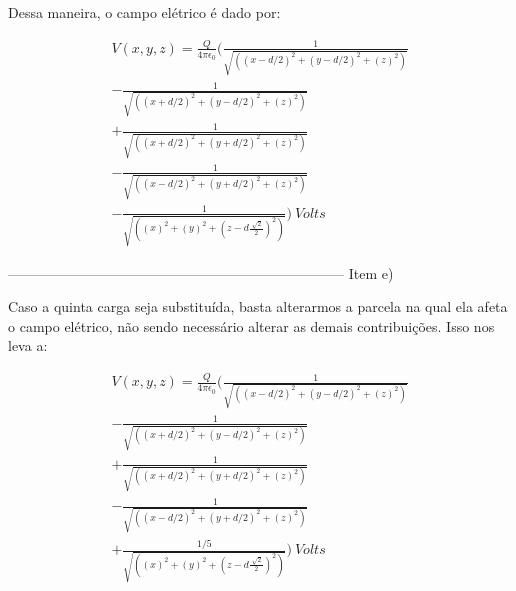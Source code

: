 \documentclass[journal,comsoc]{IEEEtran}
\begin{document}
\par Dessa maneira, o campo elétrico é dado por:

\begin{equation}
\begin{aligned}
    	V(x,y,z) = \frac{Q}{4\pi{\epsilon}_{0}}
        \Big(
        \frac
        {1} 
        {\sqrt{((x-d/2)^2+(y-d/2)^2+(z)^2)}}
        \\
        - \frac
        {1} 
        {\sqrt{((x+d/2)^2+(y-d/2)^2+(z)^2)}}
        \\
        + \frac
        {1} 
        {\sqrt{((x+d/2)^2+(y+d/2)^2+(z)^2)}}
        \\
        - \frac
        {1} 
        {\sqrt{((x-d/2)^2+(y+d/2)^2+(z)^2)}}
        \\
        - \frac
        {1} 
        {\sqrt{((x)^2+(y)^2+(z-d\frac{\sqrt[]{2}}{2})^2)}}
        \Big)\ Volts
\end{aligned}
\end{equation}

------------------------------------------------------------------------
Item e)
\par Caso a quinta carga seja substituída, basta alterarmos a parcela na qual ela afeta o campo elétrico, não sendo necessário alterar as demais contribuições. Isso nos leva a:

\begin{equation}
\begin{aligned}
    	V(x,y,z) = \frac{Q}{4\pi{\epsilon}_{0}}
        \Big(
        \frac
        {1} 
        {\sqrt{((x-d/2)^2+(y-d/2)^2+(z)^2)}}
        \\
        - \frac
        {1} 
        {\sqrt{((x+d/2)^2+(y-d/2)^2+(z)^2)}}
        \\
        + \frac
        {1} 
        {\sqrt{((x+d/2)^2+(y+d/2)^2+(z)^2)}}
        \\
        - \frac
        {1} 
        {\sqrt{((x-d/2)^2+(y+d/2)^2+(z)^2)}}
        \\
        + \frac
        {1/5} 
        {\sqrt{((x)^2+(y)^2+(z-d\frac{\sqrt[]{2}}{2})^2)}}
        \Big)\ Volts
\end{aligned}
\end{equation}

\end{document}
